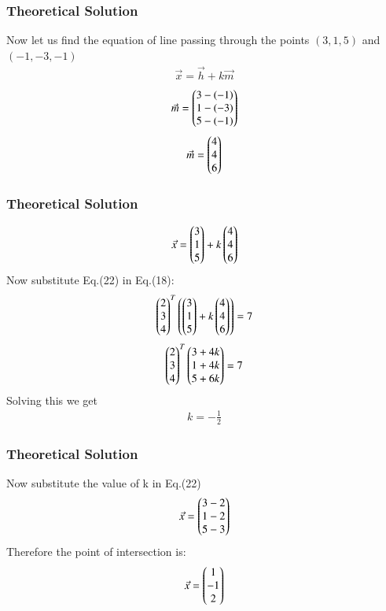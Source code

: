 \documentclass{beamer}
\begin{document}
\begin{frame}
\frametitle{Theoretical Solution}

Now let us find the equation of line passing through the points $(3,1,5)$ and $(-1,-3,-1)$
\begin{align}
    \Vec{x}=\Vec{h}+k\Vec{m}
\end{align}
\begin{align}
    \Vec{m}=\begin{pmatrix}3-(-1)\\1-(-3)\\5-(-1)\end{pmatrix}
\end{align}
\begin{align}
     \Vec{m}=\begin{pmatrix}4\\4\\6\end{pmatrix}
\end{align}
\end{frame}

\begin{frame}
\frametitle{Theoretical Solution}
  \begin{align}
    \Vec{x}=\begin{pmatrix}3\\1\\5\end{pmatrix}+k\begin{pmatrix}4\\4\\6\end{pmatrix}
\end{align}
Now substitute Eq.(22) in Eq.(18):
\begin{align}
    \begin{pmatrix}2\\3\\4\end{pmatrix}^T\left(\begin{pmatrix}3\\1\\5\end{pmatrix}+k\begin{pmatrix}4\\4\\6\end{pmatrix}\right)=7
\end{align}
\begin{align}
    \begin{pmatrix}2\\3\\4\end{pmatrix}^T\begin{pmatrix}3+4k\\1+4k\\5+6k\end{pmatrix}=7
\end{align}
Solving this we get
\begin{align}
k=-\frac{1}{2}
\end{align}
\end{frame}

\begin{frame}
\frametitle{Theoretical Solution}
   Now substitute the value of k in Eq.(22)
\begin{align}
    \Vec{x}=\begin{pmatrix}3-2\\1-2\\5-3\end{pmatrix}
\end{align}
Therefore the point of intersection is:
\begin{align}
    \Vec{x}=\begin{pmatrix}1\\-1\\2\end{pmatrix}
\end{align}
\end{frame}
\end{document}
